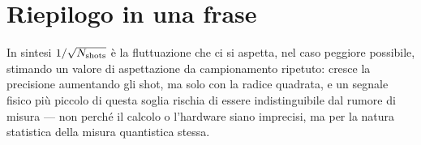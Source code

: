 \documentclass[11pt,a4paper]{article}
\begin{document}
\section{Riepilogo in una frase}

\begin{okbox}{In sintesi}
$1/\sqrt{N_{\rm shots}}$ è la fluttuazione che ci si aspetta, nel caso
peggiore possibile, stimando un valore di aspettazione da
campionamento ripetuto: cresce la precisione aumentando gli shot, ma
solo con la radice quadrata, e un segnale fisico più piccolo di questa
soglia rischia di essere indistinguibile dal rumore di misura --- non
perché il calcolo o l'hardware siano imprecisi, ma per la natura
statistica della misura quantistica stessa.
\end{okbox}
\end{document}
